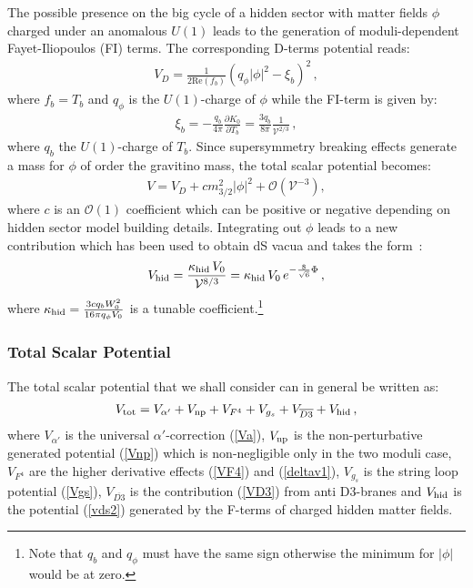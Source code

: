 \documentclass[12pt,a4paper]{book}
\newcommand\vo{{\mathcal{V}}}
\newcommand{\mc}{\mathcal}
\begin{document}
The possible presence on the big cycle of a hidden sector with matter fields $\phi$ charged under an anomalous $U(1)$ leads to the generation of moduli-dependent Fayet-Iliopoulos (FI) terms. The corresponding D-terms potential reads:
\begin{align}
V_D = \frac{1}{2 \text{Re}(f_b)} \left(q_{\phi} |\phi|^2 - \xi_b\right)^2\,,
\end{align} 
where $f_b = T_b$ and $q_\phi$ is the $U(1)$-charge of $\phi$ while the FI-term is given by:
\begin{align} 
\xi_b = - \frac{q_b}{4 \pi} \frac{\partial K_0}{\partial T_b} = \frac{3 q_b}{8 \pi} \frac{1}{\vo^{2/3}}\,,
\end{align} 
where $q_b$ the $U(1)$-charge of $T_b$. Since supersymmetry breaking effects generate a mass for $\phi$ of order the gravitino mass, the total scalar potential becomes:
\begin{align}
V = V_D + c m_{3/2}^2 |\phi|^2 + \mc{O}\left(\vo^{-3}\right),
\end{align}
where $c$ is an $\mc{O}(1)$ coefficient which can be positive or negative depending on hidden sector model building details.
Integrating out $\phi$ leads to a new contribution which has been used to obtain dS vacua and takes the form~\cite{Cicoli:2012vw, Cicoli:2013cha}:
\begin{align}
V_{\rm hid} = \frac{\kappa_{\rm hid}\,V_0}{\vo^{8/3}} = \kappa_{\rm hid}\,V_0\,e^{-\frac{8}{\sqrt{6}}\Phi}\,,
\label{vds2}
\end{align}
where $\kappa_{\rm hid} = \frac{3 c q_b W_0^2}{16 \pi q_\phi V_0}$ is a tunable coefficient.\footnote{Note that $q_b$ and $q_\phi$ must have the same sign otherwise the minimum for $|\phi|$ would be at zero.}


\subsubsection{Total Scalar Potential}

The total scalar potential that we shall consider can in general be written as:
\begin{align}
V_{\rm tot} = V_{\alpha'} + V_{\rm np} +  V_{F^4} + V_{g_s} + V_{\overline{D3}} + V_{\rm hid}\,,
\label{Vtot}
\end{align}
where $V_{\alpha'}$ is the universal $\alpha'$-correction (\ref{Va}), $V_{\rm np}$ is the non-perturbative generated potential (\ref{Vnp}) which is non-negligible only in the two moduli case, $V_{F^4}$ are the higher derivative effects (\ref{VF4}) and (\ref{deltav1}), $V_{g_s}$ is the string loop potential (\ref{Vgs}), $V_{\overline{D3}}$ is the contribution (\ref{VD3}) from anti D3-branes and $V_{\rm hid}$ is the potential (\ref{vds2}) generated by the F-terms of charged hidden matter fields.\\
\end{document}
